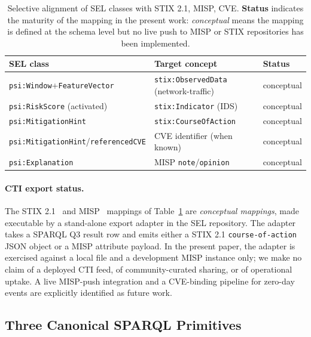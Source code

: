 \documentclass[futureinternet,article,submit,pdftex,moreauthors]{Definitions/mdpi}
\begin{document}
\begin{table}[t]
\centering
\caption{Selective alignment of SEL classes with STIX 2.1, MISP, CVE.
\textbf{Status} indicates the maturity of the mapping in the present
work: \emph{conceptual} means the mapping is defined at the schema
level but no live push to MISP or STIX repositories has been
implemented.}
\label{tab:stix}
\small
\begin{tabular}{@{}lll@{}}
\toprule
\textbf{SEL class}                 & \textbf{Target concept}            & \textbf{Status} \\
\midrule
\texttt{psi:Window}+\texttt{FeatureVector}
                                   & \texttt{stix:ObservedData} (network-traffic)
                                                                        & conceptual \\
\texttt{psi:RiskScore} (activated) & \texttt{stix:Indicator} (IDS)      & conceptual \\
\texttt{psi:MitigationHint}        & \texttt{stix:CourseOfAction}       & conceptual \\
\texttt{psi:MitigationHint}/\texttt{referencedCVE}
                                   & CVE identifier (when known)        & conceptual \\
\texttt{psi:Explanation}           & MISP \texttt{note}/\texttt{opinion}& conceptual \\
\bottomrule
\end{tabular}
\end{table}

\paragraph{CTI export status.} The STIX 2.1~\cite{stix21} and
MISP~\cite{misp} mappings of Table~\ref{tab:stix} are \emph{conceptual
mappings}, made executable by a stand-alone export adapter in the SEL
repository. The adapter takes a SPARQL Q3 result row and emits either a
STIX 2.1 \texttt{course-of-action} JSON object or a MISP attribute
payload. In the present paper, the adapter is exercised against a local
file and a development MISP instance only; we make no claim of a
deployed CTI feed, of community-curated sharing, or of operational
uptake. A live MISP-push integration and a CVE-binding pipeline for
zero-day events are explicitly identified as future work.

\subsection{Three Canonical SPARQL Primitives}
\label{sec:sel-primitives}
\end{document}
